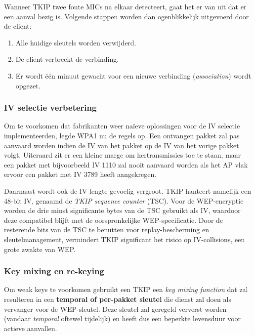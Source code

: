 \documentclass[
  10pt,
  dutch,
  paper=a4,
  ,captions=tableheading
]{scrbook}
\providecommand{\tightlist}{%
  \setlength{\itemsep}{0pt}\setlength{\parskip}{0pt}}
\begin{document}
Wanneer TKIP twee foute MICs na elkaar detecteert, gaat het er van uit
dat er een aanval bezig is. Volgende stappen worden dan ogenblikkelijk
uitgevoerd door de client:

\begin{enumerate}
\def\labelenumi{\arabic{enumi}.}
\tightlist
\item
  Alle huidige sleutels worden verwijderd.
\item
  De client verbreekt de verbinding.
\item
  Er wordt één minuut gewacht voor een nieuwe verbinding
  (\emph{association}) wordt opgezet.
\end{enumerate}

\subsubsection{IV selectie verbetering}\label{iv-selectie-verbetering}

Om te voorkomen dat fabrikanten weer naïeve oplossingen voor de IV
selectie implementeerden, legde WPA1 nu de regels op. Een ontvangen
pakket zal pas aanvaard worden indien de IV van het pakket op de IV van
het vorige pakket volgt. Uiteraard zit er een kleine marge om
hertransmissies toe te staan, maar een pakket met bijvoorbeeld IV 1110
zal nooit aanvaard worden als het AP vlak ervoor een pakket met IV 3789
heeft aangekregen.

Daarnaast wordt ook de IV lengte gevoelig vergroot. TKIP hanteert
namelijk een 48-bit IV, genaamd de \emph{TKIP sequence counter} (TSC).
Voor de WEP-encryptie worden de drie minst significante bytes van de TSC
gebruikt als IV, waardoor deze compatibel blijft met de oorspronkelijke
WEP-specificatie. Door de resterende bits van de TSC te benutten voor
replay-bescherming en sleutelmanagement, vermindert TKIP significant het
risico op IV-collisions, een grote zwakte van WEP.

\subsubsection{Key mixing en re-keying}\label{key-mixing-en-re-keying}

Om weak keys te voorkomen gebruikt een TKIP een \emph{key mixing
function} dat zal resulteren in een \textbf{temporal of per-pakket
sleutel} die dienst zal doen als vervanger voor de WEP-sleutel. Deze
sleutel zal geregeld ververst worden (vandaar \emph{temporal} oftewel
tijdelijk) en heeft dus een beperkte levensduur voor actieve aanvallen.
\end{document}

